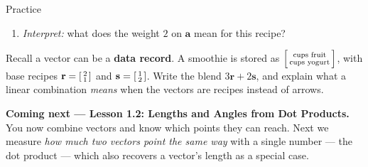 \documentclass[10pt]{article}
\begin{document}
\begin{notesbox}{Practice}
\begin{enumerate}[leftmargin=1.9em, itemsep=10pt]
\begin{enumerate}[label=(\alph*), leftmargin=1.8em, itemsep=5pt]
\begin{work}
                            + \begin{bsmallmatrix} 5 \\ 50 \end{bsmallmatrix}
                          = \begin{bsmallmatrix} 21 \\ 110 \end{bsmallmatrix}
                          \ \ 
\end{work}
      \item \emph{Interpret:} what does the weight $2$ on $\mathbf{a}$ mean for this recipe?
    \end{enumerate}
\end{enumerate}
\end{notesbox}

\begin{extensionbox}
Recall a vector can be a \textbf{data record}. A smoothie is stored as
$\begin{bsmallmatrix} \text{cups fruit} \\ \text{cups yogurt} \end{bsmallmatrix}$, with base
recipes $\mathbf{r}=\begin{bsmallmatrix} 2 \\ 1 \end{bsmallmatrix}$ and
$\mathbf{s}=\begin{bsmallmatrix} 1 \\ 2 \end{bsmallmatrix}$. Write the blend $3\mathbf{r}+2\mathbf{s}$,
and explain what a linear combination \emph{means} when the vectors are recipes instead of
arrows. 
\end{extensionbox}

\begin{spiralbox}
\textbf{Coming next --- Lesson 1.2: Lengths and Angles from Dot Products.} You now combine
vectors and know which points they can reach. Next we measure \emph{how much two vectors point
the same way} with a single number --- the dot product --- which also recovers a vector's
length as a special case.
\end{spiralbox}
\end{document}
